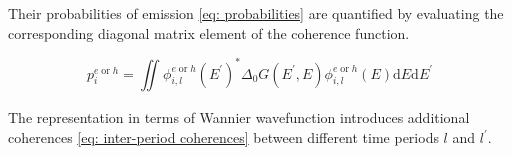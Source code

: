 
Their probabilities of emission \eqref{eq: probabilities} are quantified by evaluating the corresponding diagonal matrix element of the coherence function. 

\begin{equation}
p^{e\;\mathrm{or}\;h}_{i} = \iint_{}^{} \phi^{e\;\mathrm{or}\;h}_{i,l}\left(E^{\prime}\right)^{\ast}\Delta_{0}G\left(E^{\prime},E\right)\phi^{e\;\mathrm{or}\;h}_{i,l}\left(E\right)\mathrm{d}E\mathrm{d}E^{\prime} \label{eq: probabilities}
\end{equation}


The representation in terms of Wannier wavefunction introduces additional coherences \eqref{eq: inter-period coherences} between different time periods $l$ and $l^\prime$.

